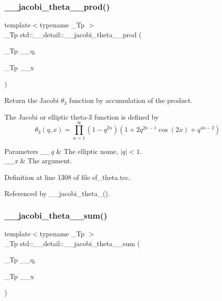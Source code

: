 \subsubsection{\texorpdfstring{\+\_\+\+\_\+jacobi\+\_\+theta\+\_\+\_\+prod()}{\_\_jacobi\_theta\_3\_prod()}}
{\footnotesize\ttfamily template$<$typename \+\_\+\+Tp $>$ \\
\+\_\+\+Tp std\+::\+\_\+\+\_\+detail\+::\+\_\+\+\_\+jacobi\+\_\+theta\+\_\+\_\+prod (\begin{DoxyParamCaption}\item[{\+\_\+\+Tp}]{\+\_\+\+\_\+q,  }\item[{\+\_\+\+Tp}]{\+\_\+\+\_\+x }\end{DoxyParamCaption})}

Return the Jacobi $ \theta_3 $ function by accumulation of the product.

The Jacobi or elliptic theta-\/3 function is defined by \[ \theta_3(q,x) = \prod_{n=1}^{\infty} (1 - q^{2n})(1 + 2q^{2n-1}\cos(2x) + q^{4n-2}) \]


\begin{DoxyParams}{Parameters}
{\em \+\_\+\+\_\+q} & The elliptic nome, $ |q| < 1 $. \\
\hline
{\em \+\_\+\+\_\+x} & The argument. \\
\hline
\end{DoxyParams}


Definition at line 1308 of file sf\+\_\+theta.\+tcc.



Referenced by \+\_\+\+\_\+jacobi\+\_\+theta\+\_().

\mbox{\label{namespacestd_1_1____detail_a07e080795e7f80c5a0b733d6bac49675}} 
\subsubsection{\texorpdfstring{\+\_\+\+\_\+jacobi\+\_\+theta\+\_\+\_\+sum()}{\_\_jacobi\_theta\_3\_sum()}}
{\footnotesize\ttfamily template$<$typename \+\_\+\+Tp $>$ \\
\+\_\+\+Tp std\+::\+\_\+\+\_\+detail\+::\+\_\+\+\_\+jacobi\+\_\+theta\+\_\+\_\+sum (\begin{DoxyParamCaption}\item[{\+\_\+\+Tp}]{\+\_\+\+\_\+q,  }\item[{\+\_\+\+Tp}]{\+\_\+\+\_\+x }\end{DoxyParamCaption})}

